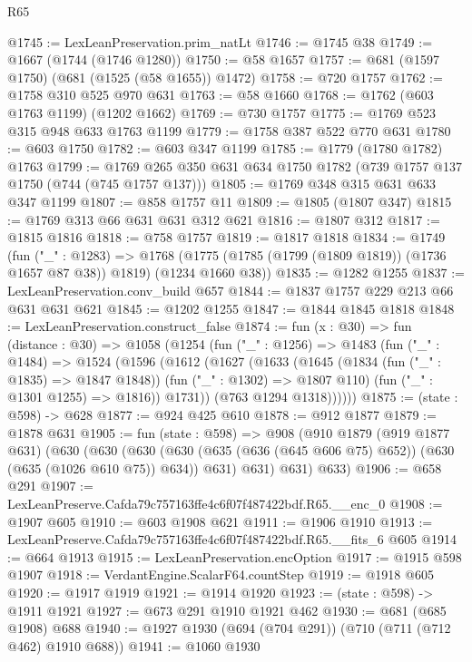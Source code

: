 \begin{lexlean}{R65}
\begin{coremodule}
@1745 := LexLeanPreservation.prim_natLt
@1746 := @1745 @38
@1749 := @1667 (@1744 (@1746 @1280))
@1750 := @58 @1657
@1757 := @681 (@1597 @1750) (@681 (@1525 (@58 @1655)) @1472)
@1758 := @720 @1757
@1762 := @1758 @310 @525 @970 @631
@1763 := @58 @1660
@1768 := @1762 (@603 @1763 @1199) (@1202 @1662)
@1769 := @730 @1757
@1775 := @1769 @523 @315 @948 @633 @1763 @1199
@1779 := @1758 @387 @522 @770 @631
@1780 := @603 @1750
@1782 := @603 @347 @1199
@1785 := @1779 (@1780 @1782) @1763
@1799 := @1769 @265 @350 @631 @634 @1750 @1782 (@739 @1757 @137 @1750 (@744 (@745 @1757 @137)))
@1805 := @1769 @348 @315 @631 @633 @347 @1199
@1807 := @858 @1757 @11
@1809 := @1805 (@1807 @347)
@1815 := @1769 @313 @66 @631 @631 @312 @621
@1816 := @1807 @312
@1817 := @1815 @1816
@1818 := @758 @1757
@1819 := @1817 @1818
@1834 := @1749
    (fun ("_" : @1283) =>
    @1768 (@1775 (@1785 (@1799 (@1809 @1819)) (@1736 @1657 @87 @38)) @1819) (@1234 @1660 @38))
@1835 := @1282 @1255
@1837 := LexLeanPreservation.conv_build @657
@1844 := @1837 @1757 @229 @213 @66 @631 @631 @621
@1845 := @1202 @1255
@1847 := @1844 @1845 @1818
@1848 := LexLeanPreservation.construct_false
@1874 := fun (x : @30) =>
  fun (distance : @30) =>
  @1058
    (@1254
      (fun ("_" : @1256) =>
      @1483
        (fun ("_" : @1484) =>
        @1524
          (@1596
            (@1612
              (@1627
                (@1633
                  (@1645
                    (@1834 (fun ("_" : @1835) => @1847 @1848))
                    (fun ("_" : @1302) => @1807 @110)
                    (fun ("_" : @1301 @1255) => @1816))
                  @1731))
              (@763 @1294 @1318))))))
@1875 := (state : @598) -> @628
@1877 := @924 @425 @610
@1878 := @912 @1877
@1879 := @1878 @631
@1905 := fun (state : @598) =>
  @908
    (@910
      @1879
      (@919 @1877 @631)
      (@630
        (@630
          (@630 (@630 (@635 (@636 (@645 @606 @75) @652)) (@630 (@635 (@1026 @610 @75)) @634)) @631)
          @631)
        @631)
      @633)
@1906 := @658 @291
@1907 := LexLeanPreserve.Cafda79c757163ffe4c6f07f487422bdf.R65.__enc_0
@1908 := @1907 @605
@1910 := @603 @1908 @621
@1911 := @1906 @1910
@1913 := LexLeanPreserve.Cafda79c757163ffe4c6f07f487422bdf.R65.__fits_6 @605
@1914 := @664 @1913
@1915 := LexLeanPreservation.encOption
@1917 := @1915 @598 @1907
@1918 := VerdantEngine.ScalarF64.countStep
@1919 := @1918 @605
@1920 := @1917 @1919
@1921 := @1914 @1920
@1923 := (state : @598) -> @1911 @1921
@1927 := @673 @291 @1910 @1921 @462
@1930 := @681 (@685 @1908) @688
@1940 := @1927 @1930 (@694 (@704 @291)) (@710 (@711 (@712 @462) @1910 @688))
@1941 := @1060 @1930

\end{coremodule}
\end{lexlean}
